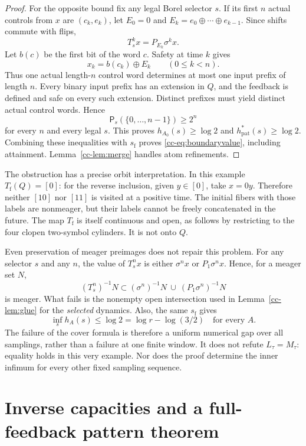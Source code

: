 \documentclass[11pt,reqno]{amsart}
\numberwithin{equation}{section}
\theoremstyle{definition}
\newcommand{\Patt}{\mathsf P}
\newcommand{\hpat}{h_{\mathrm{pat}}^{*}}
\begin{document}
\begin{proof}
For the opposite bound fix any legal Borel selector $s$. If its first
$n$ actual controls from $x$ are $(c_k,e_k)$, let
$E_0=0$ and $E_k=e_0\oplus\cdots\oplus e_{k-1}$. Since shifts commute
with flips,
\[
 T_s^k x=P_{E_k}\sigma^k x.
\]
Let $b(c)$ be the first bit of the word $c$. Safety at time $k$ gives
\begin{equation}\label{cc-eq:decode}
 x_k=b(c_k)\oplus E_k\qquad(0\le k<n).
\end{equation}
Thus one actual length-$n$ control word determines at most one input
prefix of length $n$. Every binary input prefix has an extension in
$Q$, and the feedback is defined and safe on every such extension.
Distinct prefixes must yield distinct actual control words. Hence
\[
 \Patt_s(\{0,\ldots,n-1\})\ge2^n
\]
for every $n$ and every legal $s$. This proves $h_{A_0}(s)\ge\log2$
and $\hpat(s)\ge\log2$. Combining these inequalities with
$s_{\mathrm f}$ proves \eqref{cc-eq:boundaryvalue}, including attainment.
Lemma~\ref{cc-lem:merge} handles atom refinements.
\end{proof}

The obstruction has a precise orbit interpretation. In this example
$T_{\mathrm f}(Q)=[0]$: for the reverse inclusion, given $y\in[0]$,
take $x=0y$. Therefore neither $[10]$ nor $[11]$ is visited at a
positive time. The initial fibers with those labels are nonmeager,
but their labels cannot be freely concatenated in the future.
The map $T_{\mathrm f}$ is itself continuous and open, as follows by
restricting to the four clopen two-symbol cylinders. It is not onto
$Q$.

Even preservation of meager preimages does not repair this problem.
For any selector $s$ and any $n$, the value of $T_s^n x$ is either
$\sigma^n x$ or $P_1\sigma^n x$. Hence, for a meager set $N$,
\[
 (T_s^n)^{-1}N\subset
 (\sigma^n)^{-1}N\ \cup\ (P_1\sigma^n)^{-1}N
\]
is meager. What fails is the nonempty open intersection used in
Lemma~\ref{cc-lem:glue} for the \emph{selected} dynamics. Also, the
same $s_{\mathrm f}$ gives
\[
 \inf_s h_A(s)\le\log2=\log r-\log(3/2)
 \quad\text{for every }A.
\]
The failure of the cover formula is therefore a uniform numerical
gap over all samplings, rather than a failure at one finite window.
It does not refute $L_\tau=M_\tau$: equality holds in this very example.
Nor does the proof determine the inner infimum for every other fixed
sampling sequence.


\section{Inverse capacities and a full-feedback pattern theorem}\label{sec:capacity}
\end{document}
